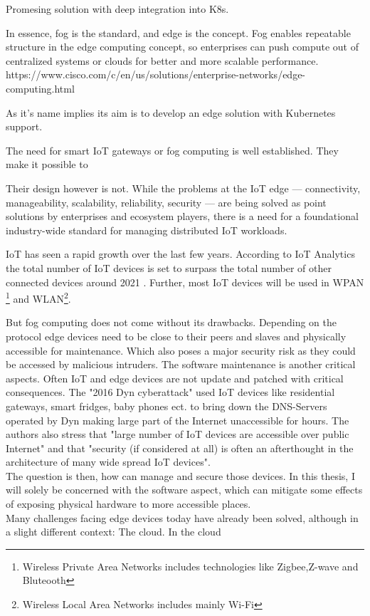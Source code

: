 {Promesing solution with deep integration into K8s.


In essence, fog is the standard, and edge is the concept. Fog enables repeatable structure in the edge computing concept, so enterprises can push compute out of centralized systems or clouds for better and more scalable performance.
https://www.cisco.com/c/en/us/solutions/enterprise-networks/edge-computing.html


As it's name implies its aim is to develop an edge solution with Kubernetes support.

The need for smart IoT gateways or fog computing is well established. They make it possible to 

Their design however is not. 
While the problems at the IoT edge — connectivity, manageability, scalability, reliability, security — are being solved as point solutions by enterprises and ecosystem players, there is a need for a foundational industry-wide standard for managing distributed IoT workloads.





IoT has seen a rapid growth over the last few years. According to IoT Analytics the total number of IoT devices is set to surpass the total number of other connected devices around 2021 \cite{StateofIoT:online}. Further, most IoT devices will be used in WPAN \footnote{Wireless Private Area Networks includes technologies like Zigbee,Z-wave and Bluteooth} and WLAN\footnote{Wireless Local Area Networks includes mainly Wi-Fi}. 


But fog computing does not come without its drawbacks. Depending on the protocol edge devices need to be close to their peers and slaves and physically accessible for maintenance. Which also poses a major security risk as they could be accessed by malicious intruders. The software maintenance is another critical aspects. Often IoT and edge devices are not update and patched with critical consequences. The "2016 Dyn cyberattack" used IoT devices like residential gateways, smart fridges, baby phones ect. to bring down the DNS-Servers operated by Dyn making large part of the Internet unaccessible for hours\cite{dynAttack}. The authors also stress that "large number of IoT devices are accessible over public Internet" and that "security (if considered at all) is often an afterthought in the architecture of many wide spread IoT devices"\cite{dynAttack}.\\
The question is then, how can manage and secure those devices. In this thesis, I will solely be concerned with the software aspect, which can mitigate some effects of exposing physical hardware to more accessible places.\\
Many challenges facing edge devices today have already been solved, although in a slight different context: The cloud\cite{IntroducingDejanBosanac:KubernetesIoTEdgeWorkingGroup}. In the cloud 




}
